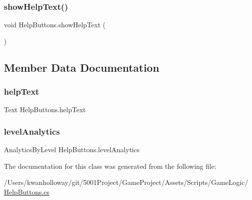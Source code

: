 \subsubsection{\texorpdfstring{show\+Help\+Text()}{showHelpText()}}
{\footnotesize\ttfamily void Help\+Buttons.\+show\+Help\+Text (\begin{DoxyParamCaption}{ }\end{DoxyParamCaption})}



\subsection{Member Data Documentation}
\mbox{\label{class_help_buttons_ab183c5e89514936aac4fdb0fb27d3ba3}} 
\subsubsection{\texorpdfstring{help\+Text}{helpText}}
{\footnotesize\ttfamily Text Help\+Buttons.\+help\+Text}

\mbox{\label{class_help_buttons_ad47263338c2ea5515badf5dc8a8bb18b}} 
\subsubsection{\texorpdfstring{level\+Analytics}{levelAnalytics}}
{\footnotesize\ttfamily Analytics\+By\+Level Help\+Buttons.\+level\+Analytics}



The documentation for this class was generated from the following file\+:\begin{DoxyCompactItemize}
\item 
/\+Users/kwanholloway/git/5001\+Project/\+Game\+Project/\+Assets/\+Scripts/\+Game\+Logic/\hyperlink{_help_buttons_8cs}{Help\+Buttons.\+cs}\end{DoxyCompactItemize}
